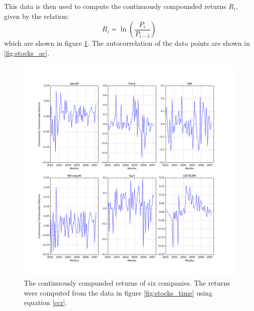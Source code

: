 \documentclass[11pt, letterpage, twocolumn]{article}
\begin{document}
This data is then used to compute the continuously compounded returns $R_i$,
given by the relation:
\begin{equation}
  R_i = \ln\left( \frac{P_i}{P_{i-1}} \right)
  \label{ccr}
\end{equation}
which are shown in figure \ref{fig:stocks_returns}. The autocorrelation of the
data points are shown in \ref{fig:stocks_ac}.

\begin{figure}
  \includegraphics[width=\linewidth]{stocks_returns.png}
  \caption{
    The continuously compunded returns of six companies. The returns were
    computed from the data in figure \ref{fig:stocks_time} using equation
    \ref{ccr}.
  }
  \label{fig:stocks_returns}
\end{figure}
\end{document}
